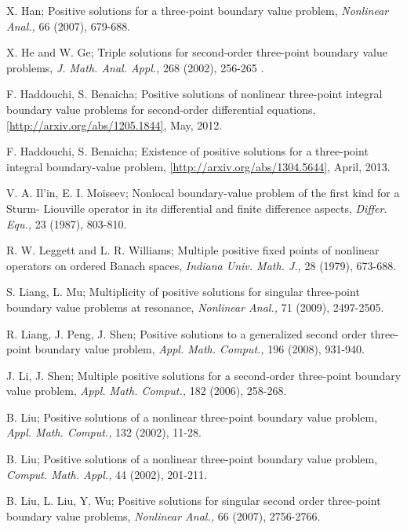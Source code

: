 \documentclass[reqno]{amsart}\usepackage{amsmath}
\begin{document}
\begin{thebibliography}{9}
 X. Han; Positive solutions for a three-point boundary value problem,
\emph{Nonlinear Anal.,} 66 (2007), 679-688.


  X. He and W. Ge; Triple solutions for second-order three-point
boundary value problems, \emph{J. Math. Anal. Appl.,} 268 (2002), 256-265 .



F. Haddouchi, S. Benaicha; Positive solutions of nonlinear three-point
  integral boundary value problems for second-order differential equations,
\url{[http://arxiv.org/abs/1205.1844]}, May, 2012.



F. Haddouchi, S. Benaicha; Existence of positive solutions for a
three-point integral boundary-value problem,
\url{[http://arxiv.org/abs/1304.5644]}, April, 2013.



 V. A. Il'in, E. I. Moiseev; Nonlocal boundary-value problem of the
first kind for a Sturm- Liouville operator in its differential and
finite difference aspects, \emph{Differ. Equ.,} 23 (1987), 803-810.


 R. W. Leggett and L. R. Williams; Multiple positive fixed points of nonlinear operators
on ordered Banach spaces, \emph{Indiana Univ. Math. J.,} 28 (1979), 673-688.


 S. Liang, L. Mu; Multiplicity of positive solutions for singular three-point boundary value
problems at resonance, \emph{Nonlinear Anal.,} 71 (2009),
2497-2505.

 R. Liang, J. Peng, J. Shen; Positive solutions to a generalized second order three-point boundary value problem, \emph{Appl. Math. Comput.,} 196 (2008), 931-940.

 J. Li, J. Shen; Multiple positive solutions for a second-order
three-point boundary value problem, \emph{Appl. Math. Comput.,} 182 (2006), 258-268.

 B. Liu; Positive solutions of a nonlinear three-point boundary value problem, \emph{Appl. Math. Comput.,} 132 (2002), 11-28.

 B. Liu; Positive solutions of a nonlinear three-point boundary value
problem, \emph{Comput. Math. Appl.,} 44 (2002), 201-211.

 B. Liu, L. Liu, Y. Wu; Positive solutions for singular second order
three-point boundary value problems, \emph{Nonlinear Anal.,} 66 (2007), 2756-2766.


\end{thebibliography}
\end{document}
